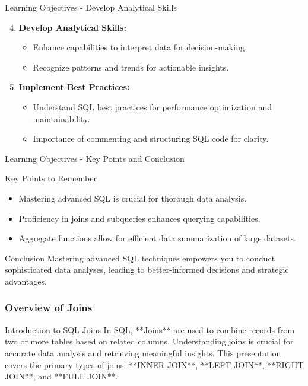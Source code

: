 \documentclass[aspectratio=169]{beamer}
\begin{document}
\begin{frame}[fragile]{Learning Objectives - Develop Analytical Skills}
    \begin{enumerate}
        \setcounter{enumi}{3}
        \item \textbf{Develop Analytical Skills:}
        \begin{itemize}
            \item Enhance capabilities to interpret data for decision-making.
            \item Recognize patterns and trends for actionable insights.
        \end{itemize}
        
        \item \textbf{Implement Best Practices:}
        \begin{itemize}
            \item Understand SQL best practices for performance optimization and maintainability.
            \item Importance of commenting and structuring SQL code for clarity.
        \end{itemize}
    \end{enumerate}
\end{frame}

\begin{frame}[fragile]{Learning Objectives - Key Points and Conclusion}
    \begin{block}{Key Points to Remember}
        \begin{itemize}
            \item Mastering advanced SQL is crucial for thorough data analysis.
            \item Proficiency in joins and subqueries enhances querying capabilities.
            \item Aggregate functions allow for efficient data summarization of large datasets.
        \end{itemize}
    \end{block}

    \begin{block}{Conclusion}
        Mastering advanced SQL techniques empowers you to conduct sophisticated data analyses, leading to better-informed decisions and strategic advantages.
    \end{block}
\end{frame}

\begin{frame}[fragile]
    \frametitle{Overview of Joins}
    
    \begin{block}{Introduction to SQL Joins}
        In SQL, **Joins** are used to combine records from two or more tables based on related columns.
        Understanding joins is crucial for accurate data analysis and retrieving meaningful insights.
        This presentation covers the primary types of joins: **INNER JOIN**, **LEFT JOIN**, **RIGHT JOIN**, and **FULL JOIN**.
    \end{block}
\end{frame}
\end{document}
